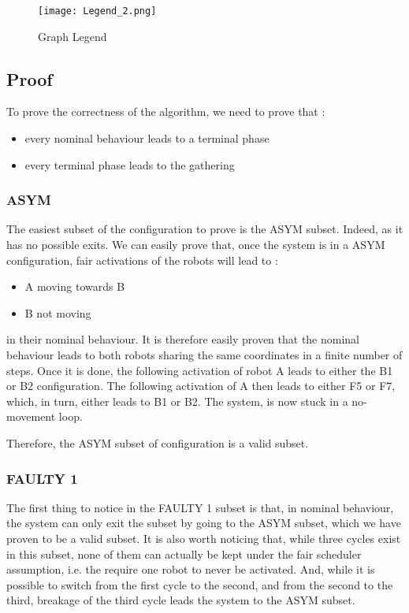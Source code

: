 \documentclass[11pt]{article}
\begin{document}
\begin{figure}[htb]
	\centering
	\texttt{[image: Legend\_2.png]}
	\caption{Graph Legend}
\end{figure}
\pagebreak

\subsection{Proof}

To prove the correctness of the algorithm, we need to prove that : 
\begin{itemize}
\item every nominal behaviour leads to a terminal phase
\item every terminal phase leads to the gathering
\end{itemize}

\subsubsection{ASYM}

The easiest subset of the configuration to prove is the ASYM subset. Indeed, as it has no possible exits. We can easily prove that, once the system is in a ASYM configuration, fair activations of the robots will lead to :

\begin{itemize}
\item A moving towards B
\item B not moving
\end{itemize}

in their nominal behaviour.
It is therefore easily proven that the nominal behaviour leads to both robots sharing the same coordinates in a finite number of steps.
Once it is done, the following activation of robot A leads to either the B1 or B2 configuration. The following activation of A then leads to either F5 or F7, which, in turn, either leads to B1 or B2. The system, is now stuck in a no-movement loop.

Therefore, the ASYM subset of configuration is a valid subset.

\subsubsection{FAULTY 1}

The first thing to notice in the FAULTY 1 subset is that, in nominal behaviour, the system can only exit the subset by going to the ASYM subset, which we have proven to be a valid subset.
It is also worth noticing that, while three cycles exist in this subset, none of them can actually be kept under the fair scheduler assumption, i.e. the require one robot to never be activated. And, while it is possible to switch from the first cycle to the second, and from the second to the third, breakage of the third cycle leads the system to the ASYM subset.
\end{document}
